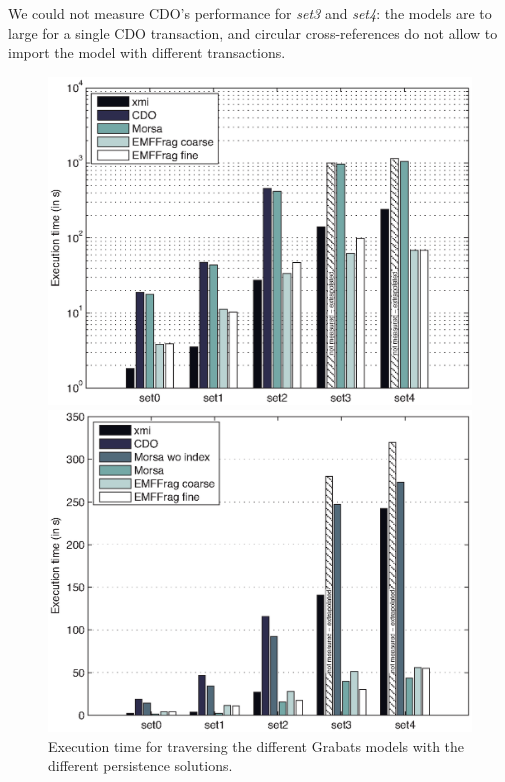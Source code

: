 We could not measure CDO's performance for \emph{set3} and \emph{set4}: the models are to large for a single CDO transaction, and circular cross-references do not allow to import the model with different transactions.

\begin{figure}[ht]
\begin{minipage}[b]{0.48\linewidth}
\centering
\includegraphics[width=\linewidth]{figures/grabatsTraverseTimeExtra}
\caption{Execution time for traversing the different Grabats models with the different persistence solutions.}
\label{fig:grabatsTraverseTime}
\end{minipage}
\hspace{0.02\linewidth}
\begin{minipage}[b]{0.48\linewidth}
\centering
\includegraphics[width=\linewidth]{figures/grabatsQueryTimeExtra}

\end{minipage}
\end{figure}
